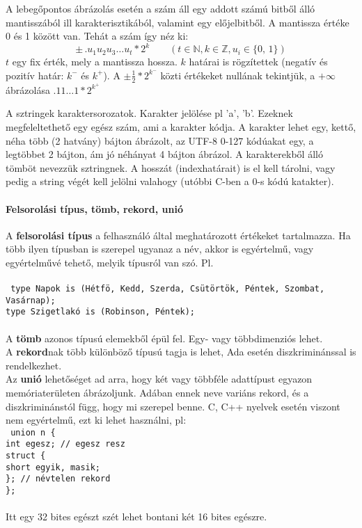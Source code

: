 \documentclass[fleqn,10pt,a4paper]{article}
\newcommand{\N}{\mathbb{N}}
\newcommand{\Z}{\mathbb{Z}}
\newcommand{\ut}[1]{\texttt{#1}}
\newcommand{\utt}[1]{\\\ut{#1}}
\theoremstyle{magyar}
\begin{document}
  A lebegőpontos ábrázolás esetén a szám áll egy addott számú bitből
  álló  mantisszából ill karakterisztikából, valamint egy
  előjelbitből. A  mantissza  értéke 0 és 1 között van. Tehát a szám
  így néz ki:
  \[\pm \, .u_1 u_2 u_3 \ldots u_t * 2^k \qquad (t\in \N, k \in  \Z,
  u_i \in \{0,\,1\})\]
  $t$ egy fix érték, mely a mantissza hossza. $k$ határai is
  rögzítettek (negatív és pozitív határ: $k^-$ és $k^+$). 
  A $\pm \frac12 * 2^{k^-}$ közti értékeket nullának tekintjük, a
  $+\infty$ ábrázolása $.11\ldots1 * 2^{k^+}$
  
  A sztringek karaktersorozatok. Karakter jelölése pl 'a', 'b'. Ezeknek
  megfeleltethető egy egész szám, ami a karakter kódja. A karakter
  lehet egy, kettő, néha több (2 hatvány) bájton ábrázolt, az UTF-8
  0-127 kódúakat egy, a legtöbbet 2 bájton, ám jó néhányat 4 bájton
  ábrázol. A karakterekből álló tömböt nevezzük sztringnek. A hosszát
  (indexhatárait) is el kell tárolni, vagy pedig a string végét kell
  jelölni valahogy (utóbbi C-ben a 0-s kódú katakter).
  
  \paragraph{Felsorolási típus, tömb, rekord, unió}
  A \textbf{felsorolási típus} a felhasználó által meghatározott értékeket
  tartalmazza. Ha több ilyen típusban is szerepel ugyanaz a név, akkor
  is egyértelmű, vagy egyértelművé tehető, melyik típusról van szó. Pl.\\
  \utt{
    type Napok is (Hétfö, Kedd, Szerda, Csütörtök, Péntek, Szombat,
  Vasárnap);\\
  type  Szigetlakó is (Robinson, Péntek);\\
  }\\
  A \textbf{tömb} azonos típusú elemekből épül fel. Egy- vagy többdimenziós lehet.\\
  A \textbf{rekord}nak több különböző típusú tagja is lehet, Ada esetén
  diszkriminánssal is rendelkezhet.\\
  Az \textbf{unió} lehetőséget ad arra, hogy két vagy többféle adattípust
  egyazon memóriaterületen ábrázoljunk. Adában ennek neve variáns
  rekord, és a diszkriminánstól függ, hogy mi szerepel benne. C, C++
  nyelvek esetén viszont nem egyértelmű, ezt ki lehet használni, pl:\\
  \ut{ union n \{\\
    \hspace*{.5em}int egesz; // egesz resz\\
    \hspace*{.5em}struct \{\\
    \hspace*{1em}short egyik, masik;\\
    \hspace*{.5em}\}; // névtelen rekord\\
    \};}\\\\
  Itt egy 32 bites egészt szét lehet bontani két 16 bites egészre.
\end{document}
